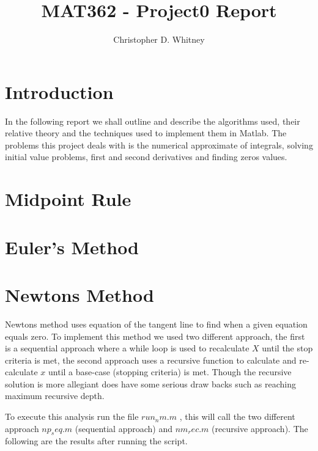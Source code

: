 \documentclass{article}
\begin{document}
\title{MAT362 - Project0 Report}
\author{Christopher D. Whitney}

\maketitle

\section{Introduction}

In the following report we shall outline and describe the algorithms used, their relative theory and the techniques used to implement them in Matlab. The problems this project deals with is the numerical approximate of integrals, solving initial value problems, first and second derivatives and finding zeros values. 

\section{Midpoint Rule}

\section{Euler's Method}

\section{Newtons Method}
Newtons method uses equation of the tangent line to find when a given equation equals zero. To implement this method we used two different approach, the first is a sequential approach where a while loop is used to recalculate $X$ until the stop criteria is met, the second approach uses a recursive function to calculate and re-calculate $x$ until a base-case (stopping criteria) is met. Though the recursive solution is more allegiant does have some serious draw backs such as reaching maximum recursive depth. 

To execute this analysis run the file $run_nm.m$ , this will call the two different approach $np_seq.m$ (sequential approach) and $nm_rec.m$ (recursive approach). The following are the results after running the script. 
\end{document}

